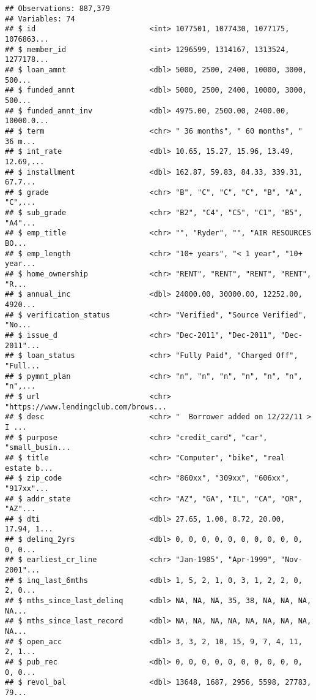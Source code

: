 \documentclass[]{article}
\begin{document}
\begin{verbatim}
## Observations: 887,379
## Variables: 74
## $ id                          <int> 1077501, 1077430, 1077175, 1076863...
## $ member_id                   <int> 1296599, 1314167, 1313524, 1277178...
## $ loan_amnt                   <dbl> 5000, 2500, 2400, 10000, 3000, 500...
## $ funded_amnt                 <dbl> 5000, 2500, 2400, 10000, 3000, 500...
## $ funded_amnt_inv             <dbl> 4975.00, 2500.00, 2400.00, 10000.0...
## $ term                        <chr> " 36 months", " 60 months", " 36 m...
## $ int_rate                    <dbl> 10.65, 15.27, 15.96, 13.49, 12.69,...
## $ installment                 <dbl> 162.87, 59.83, 84.33, 339.31, 67.7...
## $ grade                       <chr> "B", "C", "C", "C", "B", "A", "C",...
## $ sub_grade                   <chr> "B2", "C4", "C5", "C1", "B5", "A4"...
## $ emp_title                   <chr> "", "Ryder", "", "AIR RESOURCES BO...
## $ emp_length                  <chr> "10+ years", "< 1 year", "10+ year...
## $ home_ownership              <chr> "RENT", "RENT", "RENT", "RENT", "R...
## $ annual_inc                  <dbl> 24000.00, 30000.00, 12252.00, 4920...
## $ verification_status         <chr> "Verified", "Source Verified", "No...
## $ issue_d                     <chr> "Dec-2011", "Dec-2011", "Dec-2011"...
## $ loan_status                 <chr> "Fully Paid", "Charged Off", "Full...
## $ pymnt_plan                  <chr> "n", "n", "n", "n", "n", "n", "n",...
## $ url                         <chr> "https://www.lendingclub.com/brows...
## $ desc                        <chr> "  Borrower added on 12/22/11 > I ...
## $ purpose                     <chr> "credit_card", "car", "small_busin...
## $ title                       <chr> "Computer", "bike", "real estate b...
## $ zip_code                    <chr> "860xx", "309xx", "606xx", "917xx"...
## $ addr_state                  <chr> "AZ", "GA", "IL", "CA", "OR", "AZ"...
## $ dti                         <dbl> 27.65, 1.00, 8.72, 20.00, 17.94, 1...
## $ delinq_2yrs                 <dbl> 0, 0, 0, 0, 0, 0, 0, 0, 0, 0, 0, 0...
## $ earliest_cr_line            <chr> "Jan-1985", "Apr-1999", "Nov-2001"...
## $ inq_last_6mths              <dbl> 1, 5, 2, 1, 0, 3, 1, 2, 2, 0, 2, 0...
## $ mths_since_last_delinq      <dbl> NA, NA, NA, 35, 38, NA, NA, NA, NA...
## $ mths_since_last_record      <dbl> NA, NA, NA, NA, NA, NA, NA, NA, NA...
## $ open_acc                    <dbl> 3, 3, 2, 10, 15, 9, 7, 4, 11, 2, 1...
## $ pub_rec                     <dbl> 0, 0, 0, 0, 0, 0, 0, 0, 0, 0, 0, 0...
## $ revol_bal                   <dbl> 13648, 1687, 2956, 5598, 27783, 79...

\end{verbatim}
\end{document}

